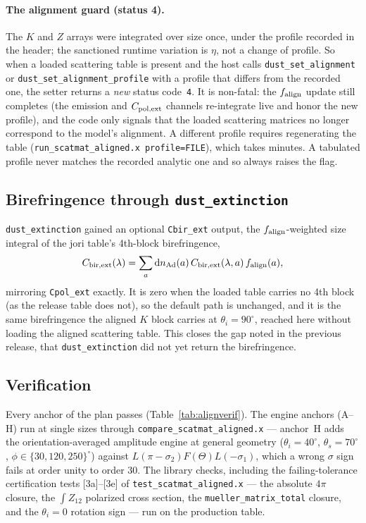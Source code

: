 \documentclass{my_memo}
\newcommand{\code}[1]{\texttt{#1}}
\begin{document}
\paragraph{The alignment guard (status 4).} The $K$ and $Z$ arrays were integrated
over size once, under the profile recorded in the header; the sanctioned runtime
variation is $\eta$, not a change of profile. So when a loaded scattering table is
present and the host calls \code{dust\_set\_alignment} or
\code{dust\_set\_alignment\_profile} with a profile that differs from the recorded
one, the setter returns a \emph{new} status code~\code{4}. It is non-fatal: the
$f_{\rm align}$ update still completes (the emission and $C_{\rm pol,ext}$ channels
re-integrate live and honor the new profile), and the code only signals that the
loaded scattering matrices no longer correspond to the model's alignment. A
different profile requires regenerating the table
(\code{run\_scatmat\_aligned.x profile=FILE}), which takes minutes. A tabulated
profile never matches the recorded analytic one and so always raises the flag.

\subsection{Birefringence through \code{dust\_extinction}}\label{sec:aligned:cbir}

\code{dust\_extinction} gained an optional \code{Cbir\_ext} output, the
$f_{\rm align}$-weighted size integral of the jori table's 4th-block
birefringence,
\[
  C_{\rm bir,ext}(\lambda)=\sum_a {\rm d}n_{\rm Ad}(a)\,
     C_{\rm bir,ext}(\lambda,a)\,f_{\rm align}(a),
\]
mirroring \code{Cpol\_ext} exactly. It is zero when the loaded table carries no
4th block (as the release table does not), so the default path is unchanged, and
it is the same birefringence the aligned $K$ block carries at $\theta_i=90^\circ$,
reached here without loading the aligned scattering table. This closes the gap
noted in the previous release, that \code{dust\_extinction} did not yet return the
birefringence.

\subsection{Verification}\label{sec:aligned:verif}

Every anchor of the plan passes (Table~\ref{tab:alignverif}). The engine anchors
(A--H) run at single sizes through \code{compare\_scatmat\_aligned.x} --- anchor~H
adds the orientation-averaged amplitude engine at general geometry
($\theta_i=40^\circ$, $\theta_s=70^\circ$, $\phi\in\{30,120,250\}^\circ$) against
$L(\pi-\sigma_2)F(\Theta)L(-\sigma_1)$, which a wrong $\sigma$ sign fails at order
unity to order 30. The library checks, including the failing-tolerance
certification tests [3a]--[3e] of \code{test\_scatmat\_aligned.x} --- the absolute
$4\pi$ closure, the $\int Z_{12}$ polarized cross section, the
\code{mueller\_matrix\_total} closure, and the $\theta_i=0$ rotation sign --- run
on the production table.
\end{document}
